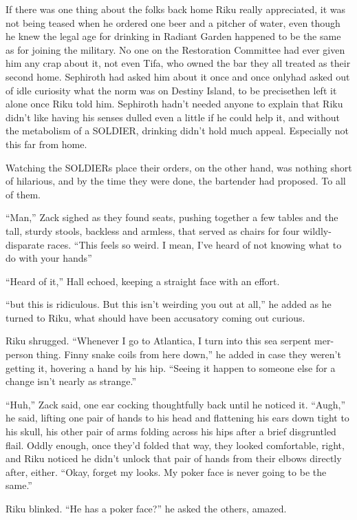 If there was one thing about the folks back home Riku really appreciated, it was not being teased when he ordered one beer and a pitcher of water, even though he knew the legal age for drinking in Radiant Garden happened to be the same as for joining the military. No one on the Restoration Committee had ever given him any crap about it, not even Tifa, who owned the bar they all treated as their second home. Sephiroth had asked him about it once and once only\textemdash had asked out of idle curiosity what the norm was on Destiny Island, to be precise\textemdash then left it alone once Riku told him. Sephiroth hadn't needed anyone to explain that Riku didn't like having his senses dulled even a little if he could help it, and without the metabolism of a SOLDIER, drinking didn't hold much appeal. Especially not this far from home.

Watching the SOLDIERs place their orders, on the other hand, was nothing short of hilarious, and by the time they were done, the bartender had proposed. To all of them.

``Man,'' Zack sighed as they found seats, pushing together a few tables and the tall, sturdy stools, backless and armless, that served as chairs for four wildly-disparate races. ``This feels so weird. I mean, I've heard of not knowing what to do with your hands\textemdash ''

``Heard of it,'' Hall echoed, keeping a straight face with an effort.

``\textemdash but this is ridiculous. But this isn't weirding you out at all,'' he added as he turned to Riku, what should have been accusatory coming out curious.

Riku shrugged. ``Whenever I go to Atlantica, I turn into this sea serpent mer-person thing. Finny snake coils from here down,'' he added in case they weren't getting it, hovering a hand by his hip. ``Seeing it happen to someone else for a change isn't nearly as strange.''

``Huh,'' Zack said, one ear cocking thoughtfully back until he noticed it. ``Augh,'' he said, lifting one pair of hands to his head and flattening his ears down tight to his skull, his other pair of arms folding across his hips after a brief disgruntled flail. Oddly enough, once they'd folded that way, they looked comfortable, right, and Riku noticed he didn't unlock that pair of hands from their elbows directly after, either. ``Okay, forget my looks. My poker face is never going to be the same.''

Riku blinked. ``He has a poker face?'' he asked the others, amazed.


